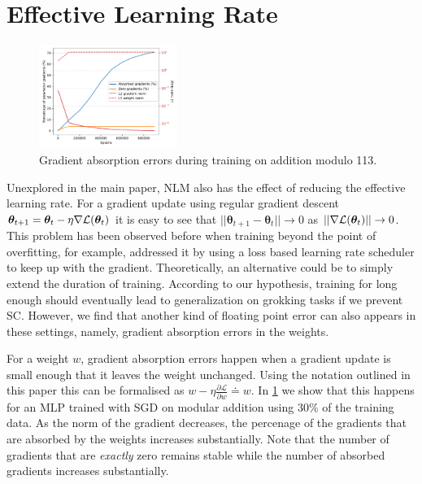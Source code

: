 \section{Effective Learning Rate}
\begin{figure}
            \vspace{-1.2cm}
            \begin{center}
    \includegraphics[width=0.4\textwidth]{grokking_iclr_arxiv/figures/gradient_norms.pdf}
            \end{center}
            \vspace{-10pt}
            \caption{Gradient absorption errors during training on addition modulo 113.}
            \label{fig:gradient_absorption}
\end{figure} 
Unexplored in the main paper, NLM also has the effect of reducing the effective learning rate. For a gradient update using regular gradient descent $\bm{\theta}_{t+1} = \bm{\theta}_t - \eta \nabla \mathcal{L}(\bm{\theta}_t)$ it is easy to see that $||\bm{\theta}_{t+1} - \bm{\theta}_{t}|| \to 0$ as $||\nabla \mathcal{L}(\bm{\theta}_t)|| \to 0$. This problem has been observed before when training beyond the point of overfitting, for example, \cite{Lyu2019-sc} addressed it by using a loss based learning rate scheduler to keep up with the gradient. Theoretically, an alternative could be to simply extend the duration of training. According to our hypothesis, training for long enough should eventually lead to generalization on grokking tasks if we prevent SC. However, we find that another kind of floating point error can also appears in these settings, namely, gradient absorption errors in the weights. 

For a weight $w$, gradient absorption errors happen when a gradient update is small enough that it leaves the weight unchanged. Using the notation outlined in this paper this can be formalised as $w -\eta \frac{\partial \mathcal{L}}{\partial w} \doteq w$. In \cref{fig:gradient_absorption} we show that this happens for an MLP trained with SGD on modular addition using 30\% of the training data. As the norm of the gradient decreases, the percenage of the gradients that are absorbed by the weights increases substantially. Note that the number of gradients that are \textit{exactly} zero remains stable while the number of absorbed gradients increases substantially.

